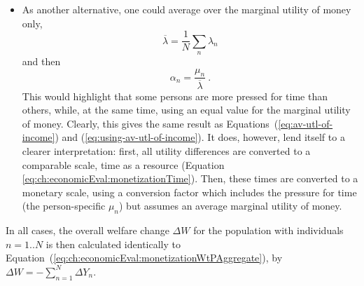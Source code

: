 \begin{itemize}
\item As another alternative, one could average over the marginal utility of money only, \ie 
\[
\overline\lambda = \frac{1}{N} \sum_n \lambda_n
\]
and then
\begin{equation}
\alpha_n = \frac{\mu_n}{\overline\lambda} \ .
\label{eq:resource-vot-w-equitable-income}
\end{equation}
This would highlight that some persons are more pressed for time than others, while, at the same time, using an equal value for the marginal utility of money.
%
Clearly, this gives the same result as Equations~(\ref{eq:av-utl-of-income}) and (\ref{eq:using-av-utl-of-income}).  It does, however, lend itself to a clearer interpretation: first, all utility differences are converted to a comparable scale, \ie time as a resource (Equation \ref{eq:ch:economicEval:monetizationTime}).  Then, these times are converted to a monetary scale, using a conversion factor which includes the pressure for time (\ie the person-specific $\mu_n$) but assumes an average marginal utility of money. 








\end{itemize}
In all cases, the overall welfare change $\Delta W$ for the population with individuals $n=1..N$ is then calculated identically to Equation~(\ref{eq:ch:economicEval:monetizationWtPAggregate}), \ie by $\Delta W = - \sum_{n=1}^N \Delta Y_n$.


